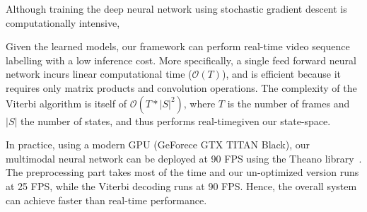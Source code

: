 Although training the deep neural network using stochastic gradient descent is computationally intensive,

%
Given the learned models,  our framework can perform real-time video sequence labelling with a low inference cost.
%
More specifically, a single feed forward neural network incurs linear computational time ($\mathcal{O}(T)$), 
and is efficient because it requires only matrix products and convolution operations. 
The complexity of the Viterbi algorithm is itself of $\mathcal{O} (T* |S|^2)$, where 
$T$ is the number of frames and $|S|$ the number of states, and thus performs real-timegiven our state-space.

In practice, using a modern GPU (GeForece GTX TITAN Black), our multimodal neural network can be deployed at 90 FPS using the  
Theano library~\cite{Bastien-Theano-2012}.
The preprocessing part takes most of the time and our un-optimized version runs at 25 FPS, while the
 Viterbi decoding  runs at 90 FPS. Hence, the overall system can achieve faster than real-time performance.





\endinput
